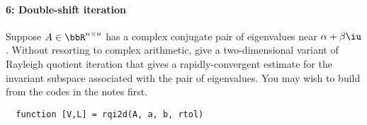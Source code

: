 \documentclass[12pt, leqno]{article} %
\begin{document}
\paragraph*{6: Double-shift iteration}
Suppose $A \in \bbR^{n \times n}$ has a complex conjugate pair of
eigenvalues near $\alpha + \beta \iu$.  Without resorting to complex
arithmetic, give a two-dimensional variant of Rayleigh quotient
iteration that gives a rapidly-convergent estimate for the invariant
subspace associated with the pair of eigenvalues.  You may wish to
build from the codes in the notes first.
\begin{lstlisting}
  function [V,L] = rqi2d(A, a, b, rtol)
\end{lstlisting}
\end{document}
